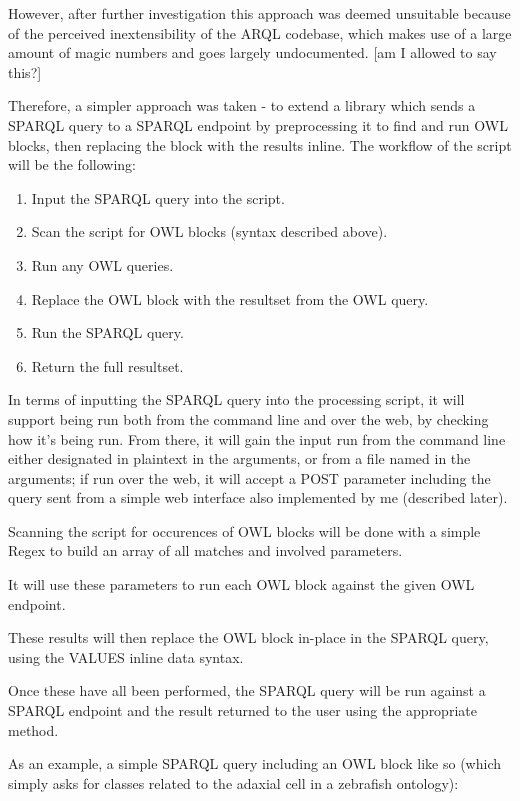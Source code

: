 \documentclass{article}
\begin{document}
However, after further investigation this approach was deemed unsuitable because
of the perceived inextensibility of the ARQL codebase, which makes use of a
large amount of magic numbers and goes largely undocumented. [am I allowed to
say this?]

Therefore, a simpler approach was taken - to extend a library which sends a
SPARQL query to a SPARQL endpoint by preprocessing it to find and run OWL
blocks, then replacing the block with the results inline. The workflow of the
script will be the following:

\begin{enumerate}
    \item Input the SPARQL query into the script.
    \item Scan the script for OWL blocks (syntax described above).
    \item Run any OWL queries.
    \item Replace the OWL block with the resultset from the OWL query.
    \item Run the SPARQL query.
    \item Return the full resultset.
\end{enumerate}

In terms of inputting the SPARQL query into the processing script, it will
support being run both from the command line and over the web, by checking how
it's being run. From there, it will gain the input run from the command line
either designated in plaintext in the arguments, or from a file named in the
arguments; if run over the web, it will accept a POST parameter including the
query sent from a simple web interface also implemented by me (described later).

Scanning the script for occurences of OWL blocks will be done with a simple
Regex to build an array of all matches and involved parameters.

It will use these parameters to run each OWL block against the given OWL 
endpoint.

These results will then replace the OWL block in-place in the SPARQL query,
using the VALUES inline data syntax.

Once these have all been performed, the SPARQL query will be run against a
SPARQL endpoint and the result returned to the user using the appropriate method.

As an example, a simple SPARQL query including an OWL block like so (which
simply asks for classes related to the adaxial cell in a zebrafish ontology):
\end{document}
